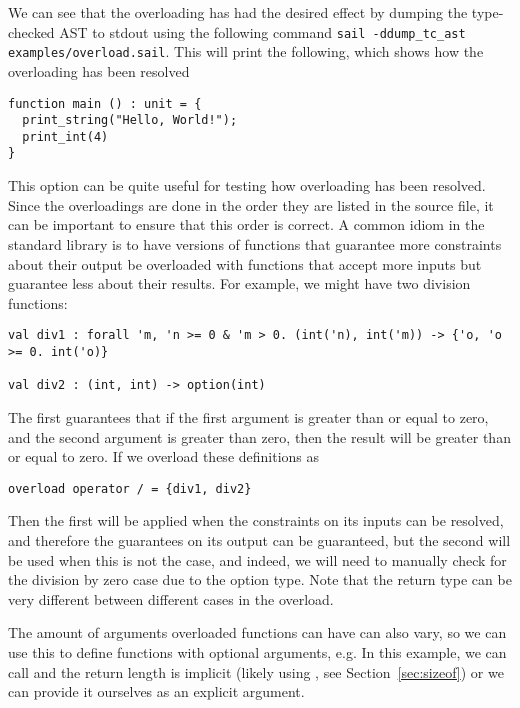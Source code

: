 

We can see that the overloading has had the desired effect by dumping
the type-checked AST to stdout using the following command
\verb+sail -ddump_tc_ast examples/overload.sail+. This will print the
following, which shows how the overloading has been resolved
\begin{lstlisting}
function main () : unit = {
  print_string("Hello, World!");
  print_int(4)
}
\end{lstlisting}
This option can be quite useful for testing how overloading has been
resolved. Since the overloadings are done in the order they are listed
in the source file, it can be important to ensure that this order is
correct. A common idiom in the standard library is to have versions of
functions that guarantee more constraints about their output be
overloaded with functions that accept more inputs but guarantee less
about their results. For example, we might have two division functions:
\begin{lstlisting}
val div1 : forall 'm, 'n >= 0 & 'm > 0. (int('n), int('m)) -> {'o, 'o >= 0. int('o)}

val div2 : (int, int) -> option(int)
\end{lstlisting}
The first guarantees that if the first argument is greater than or
equal to zero, and the second argument is greater than zero, then the
result will be greater than or equal to zero. If we overload these
definitions as
\begin{lstlisting}
overload operator / = {div1, div2}
\end{lstlisting}
Then the first will be applied when the constraints on its inputs can
be resolved, and therefore the guarantees on its output can be
guaranteed, but the second will be used when this is not the case, and
indeed, we will need to manually check for the division by zero case
due to the option type. Note that the return type can be very
different between different cases in the overload.

The amount of arguments overloaded functions can have can also vary,
so we can use this to define functions with optional arguments, e.g.
 In this example, we can call
 and the return length is implicit (likely using
, see Section~\ref{sec:sizeof}) or we can provide it
ourselves as an explicit argument.


